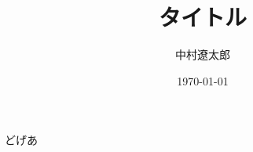 \documentclass[dvipdfmx]{beamer}
\title{タイトル}
\institute{Coda, Inc.}
\author{中村遼太郎}
\date{\today}
\begin{document}
\begin{frame}
  \titlepage
\end{frame}
\begin{frame}{どげあ}
\end{frame}
\end{document}
